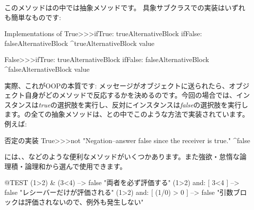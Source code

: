 \documentclass[a4paper,10pt,twoside]{book}
\begin{document}
このメソッドはの中では抽象メソッドです。
具象サブクラスでの実装はいずれも簡単なものです:

\begin{method}{Implementations of }
True>>>ifTrue: trueAlternativeBlock ifFalse: falseAlternativeBlock 
    ^trueAlternativeBlock value

False>>>ifTrue: trueAlternativeBlock ifFalse: falseAlternativeBlock 
    ^falseAlternativeBlock value
\end{method}

実際、これがOOPの本質です: メッセージがオブジェクトに送られたら、オブジェクト自身がどのメソッドで反応するかを決めるのです。今回の場合では、インスタンスは\emph{true}の選択肢を実行し、反対にインスタンスは\emph{false}の選択肢を実行します。の全ての抽象メソッドは、との中でこのような方法で実装されています。例えば:

\begin{method}{否定の実装}
True>>>not
    "Negation--answer false since the receiver is true."
    ^false
\end{method}

には、、などのような便利なメソッドがいくつかあります。また強欲・怠惰な論理積・論理和から選んで使用できます。

\begin{code}{@TEST}
(1>2) & (3<4)              --> false    "両者を必ず評価する"
(1>2) and: [ 3<4 ]        --> false    "レシーバーだけが評価される"
(1>2) and: [ (1/0) > 0 ] --> false    "引数ブロックは評価されないので、例外も発生しない"
\end{code}
\end{document}
